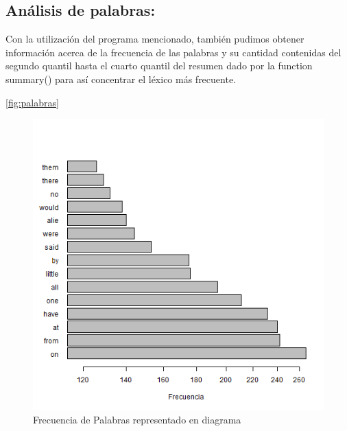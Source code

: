 \documentclass[]{article}
\begin{document}
\subsection{Análisis de palabras:}
Con la utilización del programa mencionado, también pudimos obtener información acerca de la frecuencia de las palabras y su cantidad contenidas del segundo quantil hasta el cuarto quantil del resumen dado por la function summary() para así concentrar el léxico más frecuente. 

\autoref{fig:palabras}
\begin{figure}[b]
    \centering
    \includegraphics[width=.5\linewidth]{Palabras.png}    \caption{Frecuencia de Palabras representado en diagrama}
    \label{fig:palabras}
\end{figure}


\printbibliography[title={Referencias}]
\end{document}
